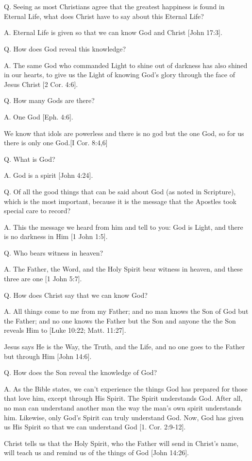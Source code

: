 \documentclass[../main.tex]{subfiles}
\begin{document}
	

	\section*{}
	Q. Seeing as most Christians agree that the greatest happiness is found in Eternal Life, what does Christ have to say about this Eternal Life?
	
	A. Eternal Life is given so that we can know God and Christ [John 17:3].
	
	Q. How does God reveal this knowledge?
	
	A. The same God who commanded Light to shine out of darkness has also shined in our hearts, to give us the Light of knowing God's glory through the face of Jesus Christ [2 Cor. 4:6]. 
	
	Q. How many Gods are there?
	
	A. One God [Eph. 4:6]. 
	
	We know that idols are powerless and there is no god but the one God, so for us there is only one God.[I Cor. 8:4,6] 
	
	Q. What is God?
	
	A. God is a spirit [John 4:24]. 
	
	Q. Of all the good things that can be said about God (as noted in Scripture), which is the most important, because it is the message that the Apostles took special care to record?
	
	A. This the message we heard from him and tell to you: God is Light, and there is no darkness in Him [1 John 1:5].
	
	Q. Who bears witness in heaven?
	
	A. The Father, the Word, and the Holy Spirit bear witness in heaven, and these three are one [1 John 5:7].
	
	Q. How does Christ say that we can know God?
	
	A. All things come to me from my Father; and no man knows the Son of God but the Father; and no one knows the Father but the Son and anyone the the Son reveals Him to [Luke 10:22; Matt. 11:27].
	
	Jesus says He is the Way, the Truth, and the Life, and no one goes to the Father but through Him [John 14:6].
	
	Q. How does the Son reveal the knowledge of God?
	
	A. As the Bible states, we can't experience the things God has prepared for those that love him, except through His Spirit. The Spirit understands God. After all, no man can understand another man the way the man's own spirit understands him. Likewise, only God's Spirit can truly understand God. Now, God has given us His Spirit so that we can understand God [1. Cor. 2:9-12].
	
	Christ tells us that the Holy Spirit, who the Father will send in Christ's name, will teach us and remind us of the things of God [John 14:26].
\end{document}
